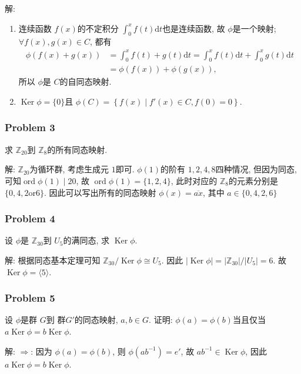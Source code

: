 \documentclass[a4paper,12pt]{ctexart}
\newcommand{\Z}{\mathbb{Z}}
\begin{document}
    解: \begin{enumerate}[label=(\arabic{*})]
      \item 连续函数 $ f(x) $的不定积分 $ \int_{0}^{x}f(t)\mathrm{d} t $也是连续函数, 故 $ \phi $是一个映射;
      $ \forall f(x),g(x)\in C $, 都有 
      \begin{align*}
        \phi(f(x)+g(x))&=\int_{0}^{x}f(t)+g(t)\mathrm{d} t=\int_{0}^{x}f(t)\mathrm{d} t+\int_{0}^{x}g(t)\mathrm{d} t\\
        &=\phi(f(x))+\phi(g(x)),
      \end{align*}
      所以 $ \phi $是 $ C $的自同态映射.
      \item $ \operatorname{Ker}\phi=\{0\} $且 $ \phi(C)=\left\{f(x) \middle| f'(x)\in C,f(0)=0\right\} $.
    \end{enumerate}
  
\subsubsection*{Problem 3}
  求 $ \Z_{20} $到 $ \Z_8 $的所有同态映射.

  解: $ \Z_{20} $为循环群, 考虑生成元 $ 1 $即可. $ \phi(1) $的阶有 $ 1,2,4,8 $四种情况, 
  但因为同态, 可知$ \operatorname{ord}\phi(1)\mid 20 $, 
  故 $ \operatorname{ord}\phi(1)=\{1,2,4\} $, 此时对应的 $\Z_8 $的元素分别是 $ \{0,4,2\text{or}6\} $. 
  因此可以写出所有的同态映射 $ \phi(x)=\overline{ax} $, 其中 $ a\in\{0,4,2,6\} $

\subsubsection*{Problem 4}
    设 $ \phi $是 $ \Z_{30} $到 $ U_5 $的满同态, 求 $ \operatorname{Ker}\phi $.
    
    解: 根据同态基本定理可知 $ \Z_{30}/\operatorname{Ker}\phi\cong U_5 $. 因此 $ \left\lvert \operatorname{Ker}\phi\right\rvert=\left\lvert \Z_{30}\right\rvert /\left\lvert U_5\right\rvert =6 $. 
    故 $  \operatorname{Ker}\phi=\langle 5\rangle $.

\subsubsection*{Problem 5}
  设 $ \phi $是群 $ G $到 群$ G' $的同态映射, $ a,b\in G $. 证明: $ \phi(a)=\phi(b) $当且仅当 $ a\operatorname{Ker}\phi=b\operatorname{Ker}\phi $.

  解: $ \Rightarrow $: 因为 $ \phi(a)=\phi(b) $, 则 $ \phi(ab^{-1})=e' $, 故 $ ab^{-1}\in\operatorname{Ker}\phi $, 因此
  $ a\operatorname{Ker}\phi=b\operatorname{Ker}\phi $.
\end{document}
